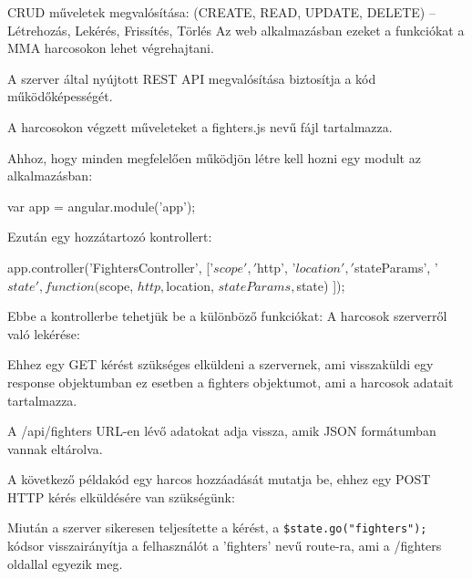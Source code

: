 
CRUD műveletek megvalósítása: (CREATE, READ, UPDATE, DELETE) – Létrehozás, Lekérés, Frissítés, Törlés
Az web alkalmazásban ezeket a funkciókat a MMA harcosokon lehet végrehajtani.

A szerver által nyújtott REST API megvalósítása biztosítja a kód működőképességét.

A harcosokon végzett műveleteket a fighters.js nevű fájl tartalmazza.

Ahhoz, hogy minden megfelelően működjön létre kell hozni egy modult az alkalmazásban:

\begin{cpp}
var app = angular.module('app');
\end{cpp}

Ezután egy hozzátartozó kontrollert:

\begin{cpp}
app.controller('FightersController', ['$scope', '$http', '$location', 
'$stateParams',  '$state', function($scope, $http, $location, 
$stateParams, $state){
}]);
\end{cpp}

Ebbe a kontrollerbe tehetjük be a különböző funkciókat: A harcosok szerverről való lekérése:


Ehhez egy GET kérést szükséges elküldeni a szervernek, ami visszaküldi egy response objektumban ez esetben a fighters objektumot, ami a harcosok adatait tartalmazza.

A /api/fighters URL-en lévő adatokat adja vissza, amik JSON formátumban vannak eltárolva.

A következő példakód egy harcos hozzáadását mutatja be, ehhez egy POST HTTP kérés elküldésére van szükségünk:


Miután a szerver sikeresen teljesítette a kérést, a \texttt{\$state.go("fighters");} kódsor
visszairányítja a felhasználót a ’fighters’ nevű route-ra, ami a /fighters oldallal egyezik meg.

